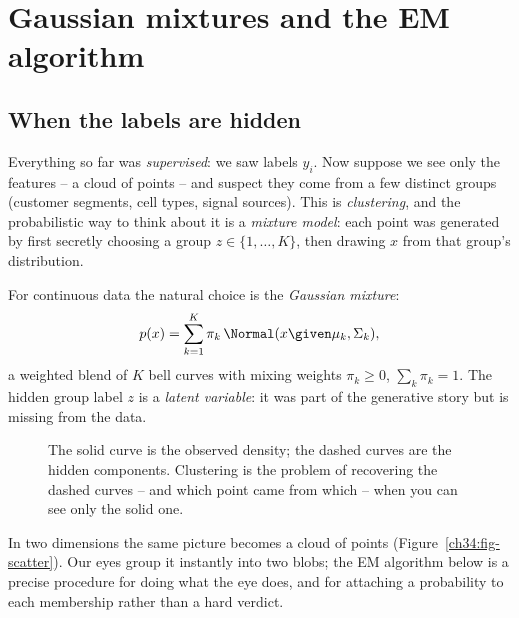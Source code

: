 \section{Gaussian mixtures and the EM algorithm}
\label{ch34:gmm-em}

\subsection{When the labels are hidden}

Everything so far was \emph{supervised}: we saw labels $y_i$. Now suppose we see
only the features -- a cloud of points -- and suspect they come from a few distinct
groups (customer segments, cell types, signal sources). This is
\emph{clustering}, and the probabilistic way to think about it is a
\emph{mixture model}: each point was generated by first secretly choosing a group
$z\in\{1,\dots,K\}$, then drawing $x$ from that group's distribution.

For continuous data the natural choice is the \emph{Gaussian mixture}:
\[
  p(x) = \sum_{k=1}^K \pi_k\,\Normal(x \given \mu_k, \Sigma_k),
\]
a weighted blend of $K$ bell curves with mixing weights $\pi_k \ge 0$,
$\sum_k\pi_k = 1$. The hidden group label $z$ is a \emph{latent variable}: it was
part of the generative story but is missing from the data.

\begin{figure}[H]
\centering
{}
\caption{The solid curve is the observed density; the dashed curves are the
hidden components. Clustering is the problem of recovering the dashed curves --
and which point came from which -- when you can see only the solid one.}
\label{ch34:fig-gmm}
\end{figure}

In two dimensions the same picture becomes a cloud of points
(Figure~\ref{ch34:fig-scatter}). Our eyes group it instantly into two blobs; the
EM algorithm below is a precise procedure for doing what the eye does, and for
attaching a probability to each membership rather than a hard verdict.

